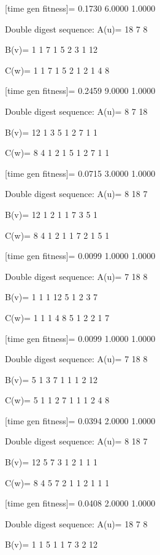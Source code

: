 [time gen fitness]=
    0.1730    6.0000    1.0000

Double digest sequence:
A(u)=
    18     7     8

B(v)=
     1     1     7     1     5     2     3     1    12

C(w)=
     1     1     7     1     5     2     1     2     1     4     8

[time gen fitness]=
    0.2459    9.0000    1.0000

Double digest sequence:
A(u)=
     8     7    18

B(v)=
    12     1     3     5     1     2     7     1     1

C(w)=
     8     4     1     2     1     5     1     2     7     1     1

[time gen fitness]=
    0.0715    3.0000    1.0000

Double digest sequence:
A(u)=
     8    18     7

B(v)=
    12     1     2     1     1     7     3     5     1

C(w)=
     8     4     1     2     1     1     7     2     1     5     1

[time gen fitness]=
    0.0099    1.0000    1.0000

Double digest sequence:
A(u)=
     7    18     8

B(v)=
     1     1     1    12     5     1     2     3     7

C(w)=
     1     1     1     4     8     5     1     2     2     1     7

[time gen fitness]=
    0.0099    1.0000    1.0000

Double digest sequence:
A(u)=
     7    18     8

B(v)=
     5     1     3     7     1     1     1     2    12

C(w)=
     5     1     1     2     7     1     1     1     2     4     8

[time gen fitness]=
    0.0394    2.0000    1.0000

Double digest sequence:
A(u)=
     8    18     7

B(v)=
    12     5     7     3     1     2     1     1     1

C(w)=
     8     4     5     7     2     1     1     2     1     1     1

[time gen fitness]=
    0.0408    2.0000    1.0000

Double digest sequence:
A(u)=
    18     7     8

B(v)=
     1     1     5     1     1     7     3     2    12

